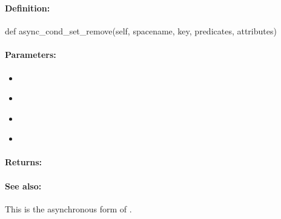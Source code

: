 \pagebreak
\subsubsection{}
\label{api:python:async_cond_set_remove}


\paragraph{Definition:}
\begin{pythoncode}
def async_cond_set_remove(self, spacename, key, predicates, attributes)
\end{pythoncode}

\paragraph{Parameters:}
\begin{itemize}[noitemsep]
\item {}\\

\item {}\\

\item {}\\

\item {}\\

\end{itemize}

\paragraph{Returns:}


\paragraph{See also:}  This is the asynchronous form of .

\pagebreak
\subsubsection{}
\label{api:python:set_intersect}


